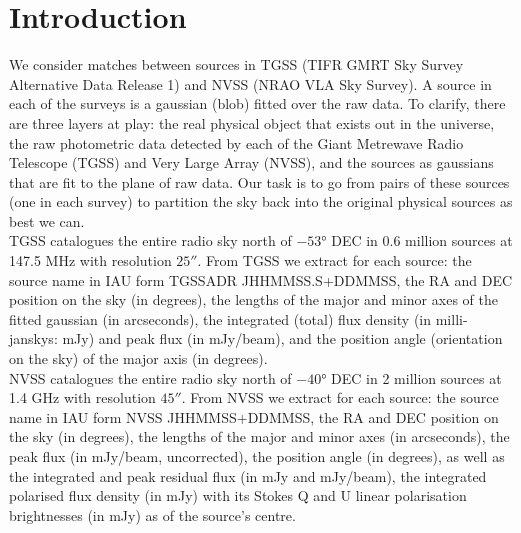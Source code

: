 \documentclass[12pt,a4paper]{article}
\begin{document}
\newpage
\section{Introduction}
\label{sec:source_catalogues}



We consider matches between sources in TGSS (TIFR GMRT Sky Survey Alternative Data Release 1) and NVSS (NRAO VLA Sky Survey). A source in each of the surveys is a gaussian (blob) fitted over the raw data. To clarify, there are three layers at play: the real physical object that exists out in the universe, the raw photometric data detected by each of the Giant Metrewave Radio Telescope (TGSS) and Very Large Array (NVSS), and the sources as gaussians that are fit to the plane of raw data. Our task is to go from pairs of these sources (one in each survey) to partition the sky back into the original physical sources as best we can. \\

TGSS catalogues the entire radio sky north of $-\ang{53}$ DEC in 0.6 million sources at 147.5 MHz with resolution $\ang{;;25}$. From TGSS we extract for each source: the source name in IAU form TGSSADR JHHMMSS.S+DDMMSS, the RA and DEC position on the sky (in degrees), the lengths of the major and minor axes of the fitted gaussian (in arcseconds), the integrated (total) flux density (in milli-janskys: mJy) and peak flux (in mJy/beam), and the position angle (orientation on the sky) of the major axis (in degrees).\\

NVSS catalogues the entire radio sky north of $-\ang{40}$ DEC in 2 million sources at 1.4 GHz with resolution $\ang{;;45}$. From NVSS we extract for each source: the source name in IAU form NVSS JHHMMSS+DDMMSS, the RA and DEC position on the sky (in degrees), the lengths of the major and minor axes (in arcseconds), the peak flux (in mJy/beam, uncorrected), the position angle (in degrees), as well as the integrated and peak residual flux (in mJy and mJy/beam), the integrated polarised flux density (in mJy) with its Stokes Q and U linear polarisation brightnesses (in mJy) as of the source's centre.
\end{document}
